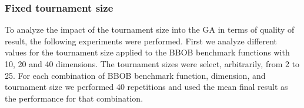 \subsubsection*{Fixed tournament size}

To analyze the impact of the tournament size into the GA in terms of quality of result, the following experiments were performed. First we analyze different values for the tournament size applied to the BBOB benchmark functions with 10, 20 and 40 dimensions. The tournament sizes were select, arbitrarily, from 2 to 25. For each combination of BBOB benchmark function, dimension, and tournament size we performed 40 repetitions and used the mean final result as the performance for that combination.

%
%
%
%
